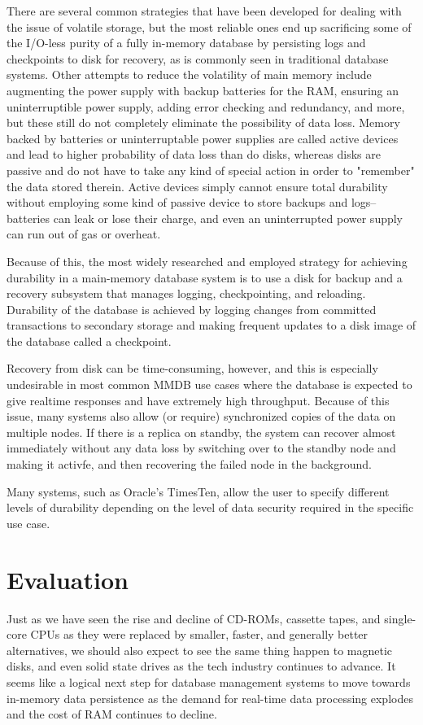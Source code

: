 \documentclass[11pt,a4paper]{report}
\begin{document}
There are several common strategies that have been developed for dealing with the issue of volatile storage, but the most reliable ones end up sacrificing some of the I/O-less purity of a fully in-memory database by persisting logs and checkpoints to disk for recovery, as is commonly seen in traditional database systems. Other attempts to reduce the volatility of main memory include augmenting the power supply with backup batteries for the RAM, ensuring an uninterruptible power supply, adding error checking and redundancy, and more, but these still do not completely eliminate the possibility of data loss. Memory backed by batteries or uninterruptable power supplies are called active devices and lead to higher probability of data loss than do disks, whereas disks are passive and do not have to take any kind of special action in order to "remember" the data stored therein. Active devices simply cannot ensure total durability without employing some kind of passive device to store backups and logs--batteries can leak or lose their charge, and even an uninterrupted power supply can run out of gas or overheat.\cite{garcia1992main}

Because of this, the most widely researched and employed strategy for achieving durability in a main-memory database system is to use a disk for backup and a recovery subsystem that manages logging, checkpointing, and reloading.\cite{raja2006comparative} Durability of the database is achieved by logging changes from committed transactions to secondary storage and making frequent updates to a disk image of the database called a checkpoint.

Recovery from disk can be time-consuming, however, and this is especially undesirable in most common MMDB use cases where the database is expected to give realtime responses and have extremely high throughput. Because of this issue, many systems also allow (or require) synchronized copies of the data on multiple nodes. If there is a replica on standby, the system can recover almost immediately without any data loss by switching over to the standby node and making it activfe, and then recovering the failed node in the background.\cite{deshmukhreview}

Many systems, such as Oracle's TimesTen, allow the user to specify different levels of durability depending on the level of data security required in the specific use case.\cite{raja2006comparative} 



\section{Evaluation}
Just as we have seen the rise and decline of CD-ROMs, cassette tapes, and single-core CPUs as they were replaced by smaller, faster, and generally better alternatives, we should also expect to see the same thing happen to magnetic disks, and even solid state drives as the tech industry continues to advance. It seems like a logical next step for database management systems to move towards in-memory data persistence as the demand for real-time data processing explodes and the cost of RAM continues to decline. 
\end{document}
